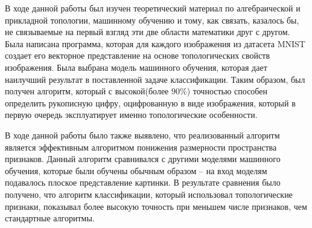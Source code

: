 В ходе данной работы был изучен теоретический материал по алгебраической и прикладной топологии, машинному обучению и тому, как связать, казалось бы, не связываемые на первый взгляд эти две области математики друг с другом. Была написана программа, которая для каждого изображения из датасета MNIST создает его векторное представление на основе топологических свойств изображения. Была выбрана модель машинного обучения, которая дает наилучший результат в поставленной задаче классификации. Таким образом, был получен алгоритм, который с высокой(более $90\%$) точностью способен определить рукописную цифру, оцифрованную в виде изображения, который в первую очередь эксплуатирует именно топологические особенности.

В ходе данной работы было также выявлено, что реализованный алгоритм является эффективным алгоритмом понижения размерности пространства признаков. Данный алгоритм сравнивался с другими моделями машинного обучения, которые были обучены обычным образом -- на вход моделям подавалось плоское представление картинки. В результате сравнения было получено, что алгоритм классификации, который использовал топологические признаки, показывал более высокую точность при меньшем числе признаков, чем стандартные алгоритмы.



